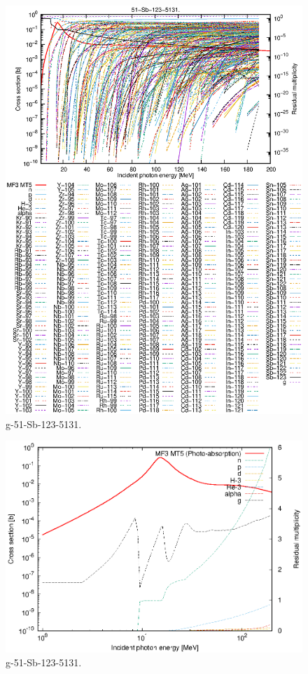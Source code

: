 \begin{figure}
 \includegraphics[width=\linewidth]{eps/g_51-Sb-123_5131.eps}
  \caption{g-51-Sb-123-5131.}
\end{figure}
\newpage \clearpage

\begin{figure}
 \includegraphics[width=\linewidth]{eps-log/g_51-Sb-123_5131.eps}
 \caption{g-51-Sb-123-5131.}
\end{figure}
\newpage \clearpage

